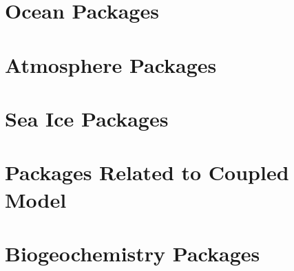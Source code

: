 \section{Ocean Packages}


\newpage


\newpage


\newpage


\newpage


\newpage


\newpage


\newpage
\section{Atmosphere Packages}


\newpage


\newpage


\newpage
\section{Sea Ice Packages}


\newpage


\newpage


\newpage


\newpage
\section{Packages Related to Coupled Model}


\newpage


\newpage


\newpage
\section{Biogeochemistry Packages}


\newpage

